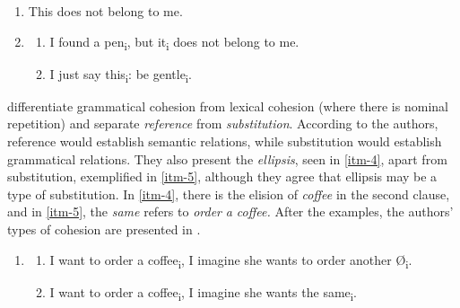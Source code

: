 \documentclass{textolivre}
\begin{document}
\begin{enumerate}[wide,label=(\arabic*),topsep=1ex,partopsep=1ex,noitemsep,leftmargin=0.15cm,resume]
\setlength{\itemindent}{0em}
\item \label{itm-2} This does not belong to me.
\item[]{} \addtocounter{enumi}{1} 
\begin{enumerate}[wide,label=(\arabic{enumi}\alph*),topsep=1ex,partopsep=1ex,noitemsep]
\setlength{\itemindent}{0em}
\item \label{itm-3a} I found a pen\textsubscript{i}, but it\textsubscript{i} does not belong to me.
\item \label{itm-3b} I just say this\textsubscript{i}: be gentle\textsubscript{i}.
\end{enumerate}
\end{enumerate}

\textcite{halliday_cohesion_1976} differentiate grammatical cohesion from
lexical cohesion (where there is nominal repetition) and separate
\emph{reference} from \emph{substitution}. According to the authors,
reference would establish semantic relations, while substitution would
establish grammatical relations. They also present the \emph{ellipsis},
seen in \ref{itm-4}, apart from substitution, exemplified in \ref{itm-5}, although they
agree that ellipsis may be a type of substitution. In \ref{itm-4}, there is the
elision of \emph{coffee} in the second clause, and in \ref{itm-5}, the
\emph{same} refers to \emph{order} \emph{a coffee.} After the examples,
the authors' types of cohesion are presented in .


%
%
\begin{enumerate}[wide,label=(\arabic*),topsep=1ex,partopsep=1ex,noitemsep,leftmargin=0.15cm,resume]
\setlength{\itemindent}{0em}
\item[]{} \addtocounter{enumi}{1}
\begin{enumerate}[wide,label=(\arabic{enumi}\alph*),topsep=1ex,partopsep=1ex,noitemsep]
\setlength{\itemindent}{0em}
\item \label{itm-4} I want to order a coffee\textsubscript{i}, I imagine she wants to order another Ø\textsubscript{i}.
\item \label{itm-5} I want to order a coffee\textsubscript{i}, I imagine she wants the same\textsubscript{i}. 
\end{enumerate}
\end{enumerate}
\end{document}
